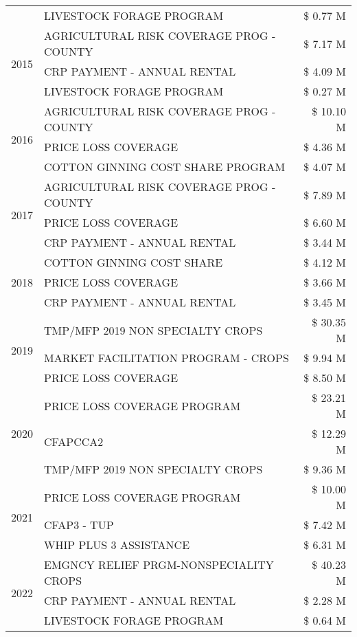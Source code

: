 \begin{tabular}{llr}
 & LIVESTOCK FORAGE PROGRAM & \$ 0.77 M \\
\cline{1-3}
\multirow[t]{3}{*}{2015} & AGRICULTURAL RISK COVERAGE PROG - COUNTY & \$ 7.17 M \\
 & CRP PAYMENT - ANNUAL RENTAL & \$ 4.09 M \\
 & LIVESTOCK FORAGE PROGRAM & \$ 0.27 M \\
\cline{1-3}
\multirow[t]{3}{*}{2016} & AGRICULTURAL RISK COVERAGE PROG - COUNTY & \$ 10.10 M \\
 & PRICE LOSS COVERAGE & \$ 4.36 M \\
 & COTTON GINNING COST SHARE PROGRAM & \$ 4.07 M \\
\cline{1-3}
\multirow[t]{3}{*}{2017} & AGRICULTURAL RISK COVERAGE PROG - COUNTY & \$ 7.89 M \\
 & PRICE LOSS COVERAGE & \$ 6.60 M \\
 & CRP PAYMENT - ANNUAL RENTAL & \$ 3.44 M \\
\cline{1-3}
\multirow[t]{3}{*}{2018} & COTTON GINNING COST SHARE & \$ 4.12 M \\
 & PRICE LOSS COVERAGE & \$ 3.66 M \\
 & CRP PAYMENT - ANNUAL RENTAL & \$ 3.45 M \\
\cline{1-3}
\multirow[t]{3}{*}{2019} & TMP/MFP 2019 NON SPECIALTY CROPS & \$ 30.35 M \\
 & MARKET FACILITATION PROGRAM - CROPS & \$ 9.94 M \\
 & PRICE LOSS COVERAGE & \$ 8.50 M \\
\cline{1-3}
\multirow[t]{3}{*}{2020} & PRICE LOSS COVERAGE PROGRAM & \$ 23.21 M \\
 & CFAPCCA2 & \$ 12.29 M \\
 & TMP/MFP 2019 NON SPECIALTY CROPS & \$ 9.36 M \\
\cline{1-3}
\multirow[t]{3}{*}{2021} & PRICE LOSS COVERAGE PROGRAM & \$ 10.00 M \\
 & CFAP3 - TUP & \$ 7.42 M \\
 & WHIP PLUS 3 ASSISTANCE & \$ 6.31 M \\
\cline{1-3}
\multirow[t]{3}{*}{2022} & EMGNCY RELIEF PRGM-NONSPECIALITY CROPS & \$ 40.23 M \\
 & CRP PAYMENT - ANNUAL RENTAL & \$ 2.28 M \\
 & LIVESTOCK FORAGE PROGRAM & \$ 0.64 M \\
\cline{1-3}
\bottomrule
\end{tabular}
